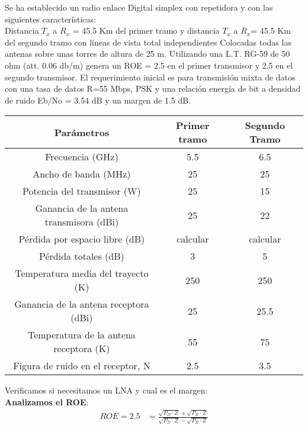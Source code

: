 \documentclass[
	12pt, %
	fleqn, %
	a4paper, %
	oneside, %
]{LegrandOrangeBook}
\begin{document}
\begin{example}
Se ha establecido un radio enlace Digital simplex con repetidora y con las siguientes características:\\
Distancia $T_x$ a $R_x$ = 45.5 Km del primer tramo y distancia $T_x$ a $R_x $= 45.5 Km del segundo tramo con líneas de vista total independientes
Colocadas todas las antenas sobre unas torres de altura de 25 m. Utilizando una L.T. RG-59 de 50 ohm (att. 0.06 db/m) genera un ROE = 2.5 en el primer transmisor y 2.5 en el segundo transmisor.
El requerimiento inicial es para transmisión mixta de datos con una tasa de datos R=55 Mbps, PSK y una relación energía de bit a densidad de ruido Eb/No = 3.54 dB y un margen de 1.5 dB.
\begin{center}
\begin{tabular}{|c|c|c|}
\hline
\rowcolor[HTML]{CBCEFB} 
Parámetros                              & Primer tramo & Segundo Tramo \\ \hline
Frecuencia (GHz)                        & 5.5          & 6.5           \\ \hline
Ancho de banda (MHz)                    & 25           & 25            \\ \hline
Potencia del transmisor (W)             & 25           & 15            \\ \hline
Ganancia de la antena transmisora (dBi) & 25           & 22            \\ \hline
Pérdida por espacio libre (dB)          & calcular     & calcular      \\ \hline
Pérdida totales (dB)                    & 3            & 5             \\ \hline
Temperatura media del trayecto (K)      & 250          & 250           \\ \hline
Ganancia de la antena receptora (dBi)   & 25           & 25.5          \\ \hline
Temperatura de la antena receptora (K)  & 55           & 75            \\ \hline
Figura de ruido en el receptor, N       & 2.5          & 3.5           \\ \hline
\end{tabular}
\end{center}
Verificamos si necesitamos un LNA y cual es el margen:\\
\textbf{Analizamos el ROE}:
\begin{align*}
ROE=2.5&=\frac{\sqrt{P_D\cdot Z}+\sqrt{P_R\cdot Z}}{\sqrt{P_D\cdot Z}-\sqrt{P_R\cdot Z}}\\

\end{align*}
\end{example}
\end{document}
